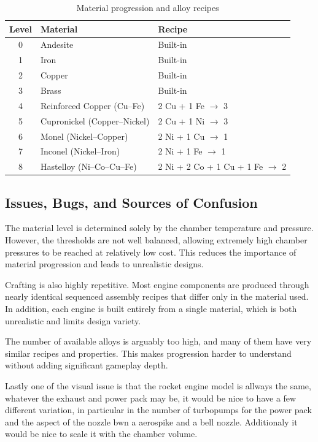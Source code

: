 \documentclass{article}
\begin{document}
\begin{table}[H]
    \centering
    \caption{Material progression and alloy recipes}
    \label{tab:material-progression}
    \begin{tabular}{|c|l|l|}
        \hline
        \textbf{Level} & \textbf{Material} & \textbf{Recipe} \\
        \hline
        0 & Andesite & Built-in \\
        1 & Iron & Built-in \\
        2 & Copper & Built-in \\
        3 & Brass & Built-in \\
        4 & Reinforced Copper (Cu--Fe) & 2 Cu + 1 Fe $\rightarrow$ 3 \\
        5 & Cupronickel (Copper--Nickel) & 2 Cu + 1 Ni $\rightarrow$ 3 \\
        6 & Monel (Nickel--Copper) & 2 Ni + 1 Cu $\rightarrow$ 1 \\
        7 & Inconel (Nickel--Iron) & 2 Ni + 1 Fe $\rightarrow$ 1 \\
        8 & Hastelloy (Ni--Co--Cu--Fe) & 2 Ni + 2 Co + 1 Cu + 1 Fe $\rightarrow$ 2 \\
        \hline
    \end{tabular}
\end{table}

\subsection{Issues, Bugs, and Sources of Confusion}

The material level is determined solely by the chamber temperature and pressure. However, the thresholds are not well balanced, allowing extremely high chamber pressures to be reached at relatively low cost. This reduces the importance of material progression and leads to unrealistic designs.

Crafting is also highly repetitive. Most engine components are produced through nearly identical sequenced assembly recipes that differ only in the material used. In addition, each engine is built entirely from a single material, which is both unrealistic and limits design variety.

The number of available alloys is arguably too high, and many of them have very similar recipes and properties. This makes progression harder to understand without adding significant gameplay depth.

Lastly one of the visual issue is that the rocket engine model is allways the same, whatever the exhaust and power pack may be, it would be nice to have a few different variation, in particular in the number of turbopumps for the power pack and the aspect of the nozzle bwn a aerospike and a bell nozzle. Additionaly it would be nice to scale it with the chamber volume.
\end{document}
